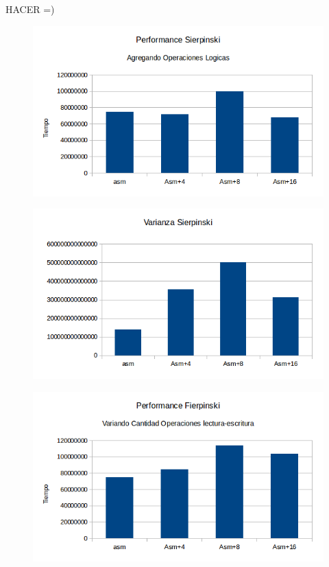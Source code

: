 \documentclass[a4paper]{article}
\begin{document}
HACER =)

\begin{figure}[h!]
  \begin{center}
  \includegraphics[scale=0.66]{Graficos1.5/sie/addsub/per.png}
  \label{nombreparareferenciar1}
  \end{center}
\end{figure}

\begin{figure}[h!]
  \begin{center}
  \includegraphics[scale=0.66]{Graficos1.5/sie/addsub/var.png}
  \label{nombreparareferenciar1}
  \end{center}
\end{figure}


\begin{figure}[h!]
  \begin{center}
  \includegraphics[scale=0.66]{Graficos1.5/sie/pushpop/per.png}
  \label{nombreparareferenciar1}
  \end{center}
\end{figure}
\end{document}
